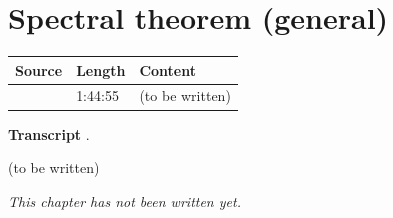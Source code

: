 \chapter{Spectral theorem (general)}\label{ch:c07}
\begin{paracol}{2}

\begin{sources}
\begin{tabularx}{\linewidth}{@{}l l L@{}}
\toprule
\textbf{Source} & \textbf{Length} & \textbf{Content}\\
\midrule
{} & 1:44:55 & (to be written)\\
\bottomrule
\end{tabularx}

\smallskip
\textbf{Transcript} .
\end{sources}

\begin{reading}
(to be written)
\end{reading}

\emph{This chapter has not been written yet.}

\flushside
\end{paracol}
